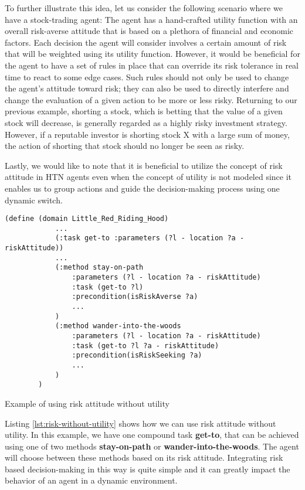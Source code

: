 To further illustrate this idea, let us consider the following scenario where we have a stock-trading agent: The agent has a hand-crafted utility function with an overall risk-averse attitude that is based on a plethora of financial and economic factors. Each decision the agent will consider involves a certain amount of risk that will be weighted using its utility function. However, it would be beneficial for the agent to have a set of rules in place that can override its risk tolerance in real time to react to some edge cases. Such rules should not only be used to change the agent's attitude toward risk; they can also be used to directly interfere and change the evaluation of a given action to be more or less risky. Returning to our previous example, shorting a stock, which is betting that the value of a given stock will decrease, is generally regarded as a highly risky investment strategy. However, if a reputable investor is shorting stock X with a large sum of money, the action of shorting that stock should no longer be seen as risky.

Lastly, we would like to note that it is beneficial to utilize the concept of risk attitude in HTN agents even when the concept of utility is not modeled since it enables us to group actions and guide the decision-making process using one dynamic switch.

\begin{Listing}
    \begin{lstlisting}[language=HDDL]
        (define (domain Little_Red_Riding_Hood)
            ...
            (:task get-to :parameters (?l - location ?a - riskAttitude))
            ...
            (:method stay-on-path
                :parameters (?l - location ?a - riskAttitude)
                :task (get-to ?l)
                :precondition(isRiskAverse ?a)
                ...
            )
            (:method wander-into-the-woods
                :parameters (?l - location ?a - riskAttitude)
                :task (get-to ?l ?a - riskAttitude)
                :precondition(isRiskSeeking ?a)
                ...
            )
        )
    \end{lstlisting}
    \caption{Example of using risk attitude without utility}
    \label{lst:risk-without-utility}
\end{Listing}

Listing \ref{lst:risk-without-utility} shows how we can use risk attitude without utility. In this example, we have one compound task \textbf{get-to}, that can be achieved using one of two methods \textbf{stay-on-path} or \textbf{wander-into-the-woods}. The agent will choose between these methods based on its risk attitude. Integrating risk based decision-making in this way is quite simple and it can greatly impact the behavior of an agent in a dynamic environment.

